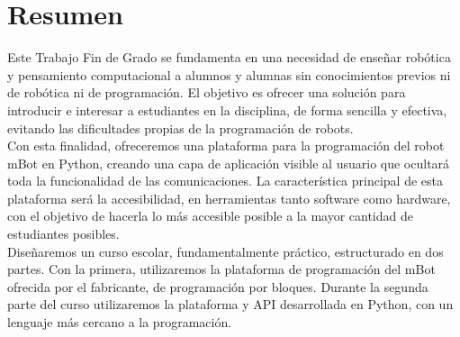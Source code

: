 \chapter*{Resumen}

\label{cap:resumen}

Este Trabajo Fin de Grado se fundamenta en una necesidad de enseñar robótica y pensamiento computacional a alumnos y alumnas sin conocimientos previos ni de robótica ni de programación. El objetivo es ofrecer una solución para introducir e interesar a estudiantes en la disciplina, de forma sencilla y efectiva, evitando las dificultades propias de la programación de robots.\\

Con esta finalidad, ofreceremos una plataforma para la programación del robot mBot en Python, creando una capa de aplicación visible al usuario que ocultará toda la funcionalidad de las  comunicaciones. La característica principal de esta plataforma será la accesibilidad, en herramientas tanto software como hardware, con el objetivo de hacerla lo más accesible posible a la mayor cantidad de estudiantes posibles.\\

Diseñaremos un curso escolar, fundamentalmente práctico, estructurado en dos partes. Con la primera, utilizaremos la plataforma de programación del mBot ofrecida por el fabricante, de programación por bloques. Durante la segunda parte del curso utilizaremos la plataforma y API desarrollada en Python, con un lenguaje más cercano a la programación.\\

\afterpage{\null\newpage}